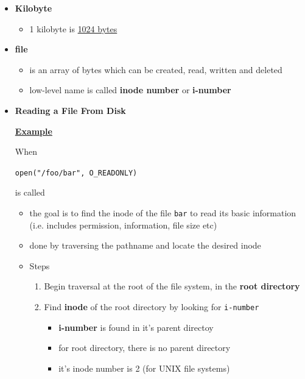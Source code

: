 \documentclass[12pt]{article}
\begin{document}
\begin{enumerate}[1.]
\begin{itemize}
        \item \textbf{Kilobyte}

        \begin{itemize}
            \item 1 kilobyte is \underline{1024 bytes}
        \end{itemize}

        \item \textbf{file}
        \begin{itemize}
            \item is an array of bytes which can be created, read, written and deleted
            \item low-level name is called \textbf{inode number} or \textbf{i-number}
        \end{itemize}
        \item \textbf{Reading a File From Disk}

        \bigskip

        \underline{\textbf{Example}}

        \bigskip

        When

        \bigskip

        \texttt{open("/foo/bar", O\_READONLY)}

        \bigskip

        is called

        \bigskip

        \begin{itemize}
            \item the goal is to find the inode of the file \texttt{bar} to read its basic information
            (i.e. includes permission, information, file size etc)
            \item done by traversing the pathname and locate the desired inode
            \item Steps

            \begin{enumerate}[1.]
                \item Begin traversal at the root of the file system, in the \textbf{root directory}

                \item Find \textbf{inode} of the root directory by looking for \texttt{i-number}

                \begin{itemize}
                    \item \textbf{i-number} is found in it's parent directoy
                    \item for root directory, there is no parent directory
                    \item it's inode number is 2 (for UNIX file systems)
                \end{itemize}


\end{enumerate}
\end{itemize}
\end{itemize}
\end{enumerate}
\end{document}
